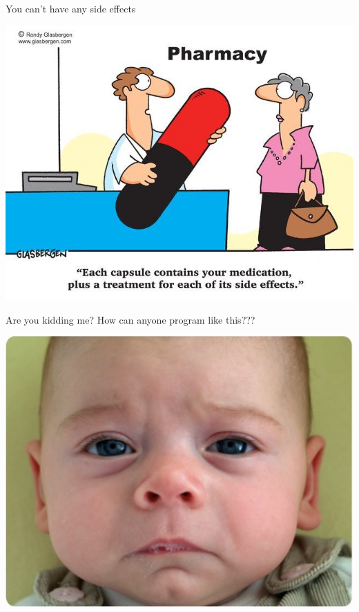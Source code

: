 \documentclass[mathserif]{beamer}
\begin{document}
\begin{frame}{You can't have any side effects}
  \begin{center}
    \includegraphics[scale=0.4]{img/side-effects-cartoon.jpg}
  \end{center}
\end{frame}

\begin{frame}{Are you kidding me?}
  How can anyone program like this???
  \begin{center}
    \includegraphics[scale=0.3]{img/sadbaby.png}
  \end{center}
\end{frame}
\end{document}
